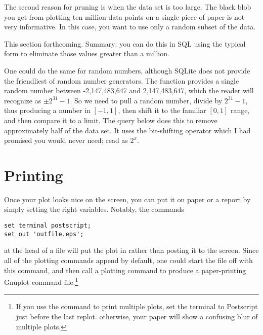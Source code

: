 The second reason for pruning is when the data set is too large. The black
blob you get from plotting ten million data points on a single piece of
paper is not very informative. In this case, you want to use only a
random subset of the data.

This section forthcoming. Summary: you can do this in SQL using the
typical  form to eliminate
those values greater than a million. 

One could do the same for random
numbers, although SQLite does not provide the friendliest of random
number generators. The  function provides a single random
number between -2,147,483,647 and 2,147,483,647, which the reader will
recognize as $\pm 2^{31}-1$. So we need to pull a random number,
divide by $2^{31}-1$, thus producing a number in $[-1,1]$, then shift it
to the familiar $[0,1]$ range, and then compare it to a limit. The
query below does this to remove approximately half of the data set.
It uses the bit-shifting operator which I had promised you would never
need; read  as $2^x$.



\section{Printing}  
Once your plot looks nice on the screen, you can put it on paper or a
report by simply setting the right variables. Notably, the commands
\begin{lstlisting}
set terminal postscript;
set out 'outfile.eps';
\end{lstlisting}

at the head of a file will put the plot in  rather
than posting it to the screen. Since all of the plotting commands append
by default, one could start the file off with this command, and then
call a plotting command to produce a paper-printing Gnuplot command file.\footnote{If you use the  command to print multiple plots, set the terminal to Postscript just before the last replot. otherwise, your paper will show a confusing blur of multiple plots.}

